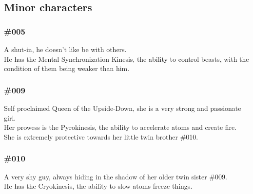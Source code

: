 \begin{center}
\end{center}

\subsection{Minor characters}

\subsubsection{\#005}
A shut-in, he doesn't like be with others.\\
He has the Mental Synchronization Kinesis, the ability to control beasts, with the condition of them being weaker than him.

\subsubsection{\#009}
Self proclaimed Queen of the Upside-Down, she is a very strong and passionate girl.\\
Her prowess is the Pyrokinesis, the ability to accelerate atoms and create fire.\\
She is extremely protective towards her little twin brother \#010.

\subsubsection{\#010}
A very shy guy, always hiding in the shadow of her older twin sister \#009.\\
He has the Cryokinesis, the ability to slow atoms freeze things.
